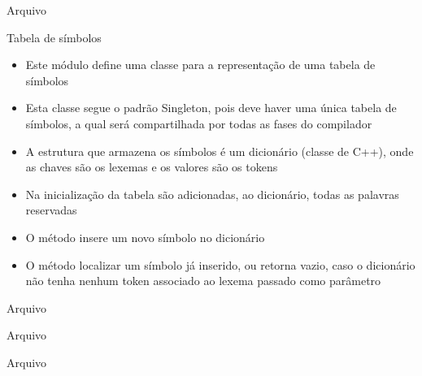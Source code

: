 \begin{frame}[fragile]{Arquivo }
\end{frame}

\begin{frame}[fragile]{Tabela de símbolos}

    \begin{itemize}
        \item Este módulo define uma classe para a representação de uma tabela de símbolos
        \pause

        \item Esta classe segue o padrão Singleton, pois deve haver uma única tabela de símbolos, a qual será compartilhada por todas as fases do compilador
        \pause

        \item A estrutura que armazena os símbolos é um dicionário (classe  de C++), onde as chaves são os lexemas e os valores são os tokens
        \pause

        \item Na inicialização da tabela são adicionadas, ao dicionário, todas as palavras reservadas
        \pause

        \item O método  insere um novo símbolo no dicionário
        \pause

        \item O método  localizar um símbolo já inserido, ou retorna vazio, caso o dicionário não tenha nenhum token associado ao lexema
            passado como parâmetro
    \end{itemize}

\end{frame}

\begin{frame}[fragile]{Arquivo }
\end{frame}

\begin{frame}[fragile]{Arquivo }
\end{frame}

\begin{frame}[fragile]{Arquivo }
\end{frame}

